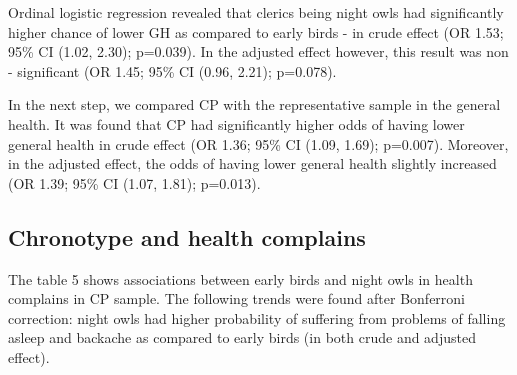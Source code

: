 \documentclass[ijerph,article,accept,moreauthors,pdftex]{mdpi}
\begin{document}
Ordinal logistic regression revealed that clerics being night owls had
significantly higher chance of lower GH as compared to early birds - in
crude effect (OR 1.53; 95\% CI (1.02, 2.30); p=0.039). In the adjusted
effect however, this result was non - significant (OR 1.45; 95\% CI
(0.96, 2.21); p=0.078).

In the next step, we compared CP with the representative sample in the
general health. It was found that CP had significantly higher odds of
having lower general health in crude effect (OR 1.36; 95\% CI (1.09,
1.69); p=0.007). Moreover, in the adjusted effect, the odds of having
lower general health slightly increased (OR 1.39; 95\% CI (1.07, 1.81);
p=0.013).

\hypertarget{chronotype-and-health-complains}{%
\subsection{Chronotype and health
complains}\label{chronotype-and-health-complains}}

The table 5 shows associations between early birds and night owls in
health complains in CP sample. The following trends were found after
Bonferroni correction: night owls had higher probability of suffering
from problems of falling asleep and backache as compared to early birds
(in both crude and adjusted effect).

\begin{table}[!h]

\caption{\label{tab:Print regres tab 5}Depicts associations (in Odds rations) between eary bird and night owns and health complains (Sample 3)}
\centering
{}
\end{table}
\end{document}
